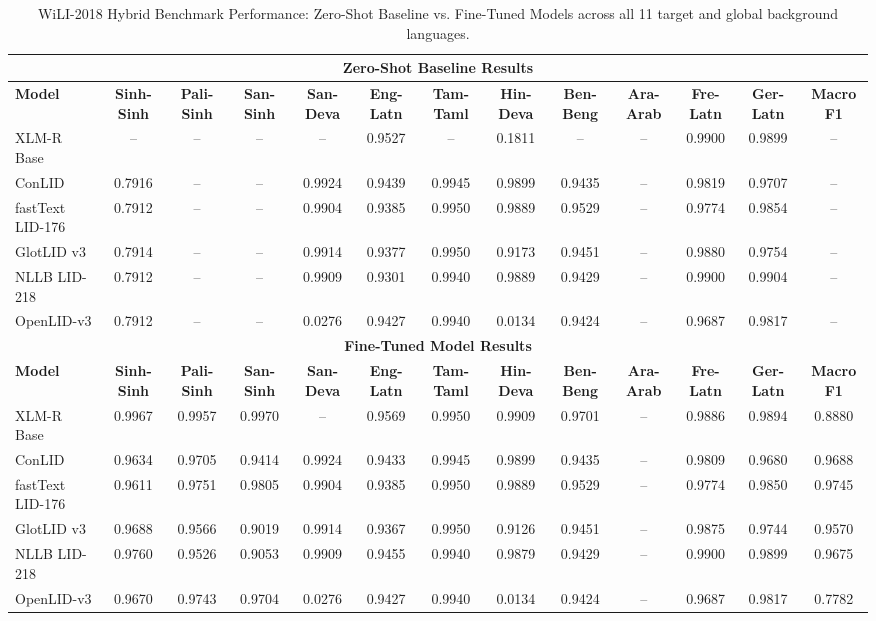 \documentclass[11pt]{article}
\begin{document}
\begin{table}[p]
\vspace{12pt}

\caption{WiLI-2018 Hybrid Benchmark Performance: Zero-Shot Baseline vs. Fine-Tuned Models across all 11 target and global background languages.}
\label{tab:wili_full}
\begin{tabular}{l ccc cccccccc c}
\toprule
\multicolumn{13}{c}{\textbf{Zero-Shot Baseline Results}} \\
\midrule
\textbf{Model} & \textbf{Sinh-Sinh} & \textbf{Pali-Sinh} & \textbf{San-Sinh} & \textbf{San-Deva} & \textbf{Eng-Latn} & \textbf{Tam-Taml} & \textbf{Hin-Deva} & \textbf{Ben-Beng} & \textbf{Ara-Arab} & \textbf{Fre-Latn} & \textbf{Ger-Latn} & \textbf{Macro F1} \\
\midrule
XLM-R Base & -- & -- & -- & -- & 0.9527 & -- & 0.1811 & -- & -- & 0.9900 & 0.9899 & -- \\
ConLID & 0.7916 & -- & -- & 0.9924 & 0.9439 & 0.9945 & 0.9899 & 0.9435 & -- & 0.9819 & 0.9707 & -- \\
fastText LID-176 & 0.7912 & -- & -- & 0.9904 & 0.9385 & 0.9950 & 0.9889 & 0.9529 & -- & 0.9774 & 0.9854 & -- \\
GlotLID v3 & 0.7914 & -- & -- & 0.9914 & 0.9377 & 0.9950 & 0.9173 & 0.9451 & -- & 0.9880 & 0.9754 & -- \\
NLLB LID-218 & 0.7912 & -- & -- & 0.9909 & 0.9301 & 0.9940 & 0.9889 & 0.9429 & -- & 0.9900 & 0.9904 & -- \\
OpenLID-v3 & 0.7912 & -- & -- & 0.0276 & 0.9427 & 0.9940 & 0.0134 & 0.9424 & -- & 0.9687 & 0.9817 & -- \\
\midrule
\multicolumn{13}{c}{\textbf{Fine-Tuned Model Results}} \\
\midrule
\textbf{Model} & \textbf{Sinh-Sinh} & \textbf{Pali-Sinh} & \textbf{San-Sinh} & \textbf{San-Deva} & \textbf{Eng-Latn} & \textbf{Tam-Taml} & \textbf{Hin-Deva} & \textbf{Ben-Beng} & \textbf{Ara-Arab} & \textbf{Fre-Latn} & \textbf{Ger-Latn} & \textbf{Macro F1} \\
\midrule
XLM-R Base & 0.9967 & 0.9957 & 0.9970 & -- & 0.9569 & 0.9950 & 0.9909 & 0.9701 & -- & 0.9886 & 0.9894 & 0.8880 \\
ConLID & 0.9634 & 0.9705 & 0.9414 & 0.9924 & 0.9433 & 0.9945 & 0.9899 & 0.9435 & -- & 0.9809 & 0.9680 & 0.9688 \\
fastText LID-176 & 0.9611 & 0.9751 & 0.9805 & 0.9904 & 0.9385 & 0.9950 & 0.9889 & 0.9529 & -- & 0.9774 & 0.9850 & 0.9745 \\
GlotLID v3 & 0.9688 & 0.9566 & 0.9019 & 0.9914 & 0.9367 & 0.9950 & 0.9126 & 0.9451 & -- & 0.9875 & 0.9744 & 0.9570 \\
NLLB LID-218 & 0.9760 & 0.9526 & 0.9053 & 0.9909 & 0.9455 & 0.9940 & 0.9879 & 0.9429 & -- & 0.9900 & 0.9899 & 0.9675 \\
OpenLID-v3 & 0.9670 & 0.9743 & 0.9704 & 0.0276 & 0.9427 & 0.9940 & 0.0134 & 0.9424 & -- & 0.9687 & 0.9817 & 0.7782 \\
\bottomrule
\end{tabular}
\end{table}
\end{document}

